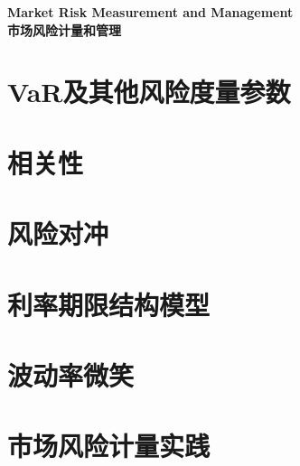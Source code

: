 \documentclass{article}
\begin{document}

\graphicspath{{images/}}

\begin{center}
\textbf{\Huge Market Risk Measurement and Management}\\
\textbf{\Huge 市场风险计量和管理}\\
\end{center}
\section{VaR及其他风险度量参数}


\section{相关性}


\section{风险对冲}


\section{利率期限结构模型}


\section{波动率微笑}


\section{市场风险计量实践}

\end{document}
